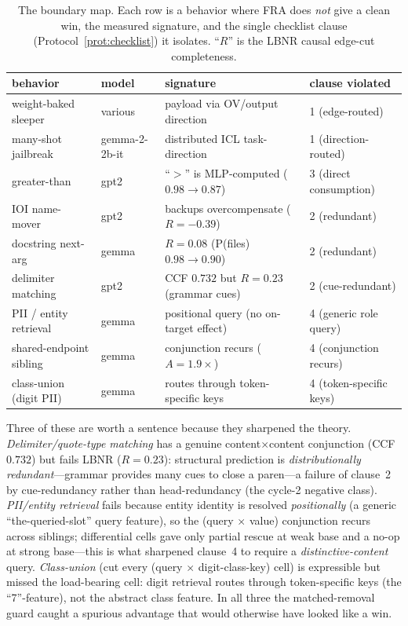 \documentclass[11pt]{article}
\theoremstyle{definition}
\theoremstyle{plain}
\theoremstyle{remark}
\begin{document}
\begin{table}[t]
\centering
\caption{The boundary map. Each row is a behavior where FRA does \emph{not} give a clean win, the measured signature, and the single checklist clause (Protocol~\ref{prot:checklist}) it isolates. ``$R$'' is the LBNR causal edge-cut completeness.}
\label{tab:boundary}
\setlength{\tabcolsep}{4pt}
\small
\begin{tabular}{llll}
\toprule
behavior & model & signature & clause violated \\
\midrule
weight-baked sleeper   & various  & payload via OV/output direction          & 1 (edge-routed) \\
many-shot jailbreak    & gemma-2-2b-it & distributed ICL task-direction      & 1 (direction-routed) \\
greater-than           & gpt2     & ``$>$'' is MLP-computed ($0.98{\to}0.87$) & 3 (direct consumption) \\
IOI name-mover         & gpt2     & backups overcompensate ($R{=}{-}0.39$)    & 2 (redundant) \\
docstring next-arg     & gemma    & $R{=}0.08$ (P(files) $0.98{\to}0.90$)     & 2 (redundant) \\
delimiter matching     & gpt2     & CCF $0.732$ but $R{=}0.23$ (grammar cues) & 2 (cue-redundant) \\
PII / entity retrieval & gemma    & positional query (no on-target effect) & 4 (generic role query) \\
shared-endpoint sibling & gemma   & conjunction recurs ($A{=}1.9\times$)      & 4 (conjunction recurs) \\
class-union (digit PII) & gemma   & routes through token-specific keys        & 4 (token-specific keys) \\
\bottomrule
\end{tabular}
\end{table}

Three of these are worth a sentence because they sharpened the theory. \emph{Delimiter/quote-type matching} has a genuine content$\times$content conjunction (CCF $0.732$) but fails LBNR ($R{=}0.23$): structural prediction is \emph{distributionally redundant}---grammar provides many cues to close a paren---a failure of clause~2 by cue-redundancy rather than head-redundancy (the cycle-2 negative class). \emph{PII/entity retrieval} fails because entity identity is resolved \emph{positionally} (a generic ``the-queried-slot'' query feature), so the (query $\times$ value) conjunction recurs across siblings; differential cells gave only partial rescue at weak base and a no-op at strong base---this is what sharpened clause~4 to require a \emph{distinctive-content} query. \emph{Class-union} (cut every (query $\times$ digit-class-key) cell) is expressible but missed the load-bearing cell: digit retrieval routes through token-specific keys (the ``7''-feature), not the abstract class feature. In all three the matched-removal guard caught a spurious advantage that would otherwise have looked like a win.
\end{document}

